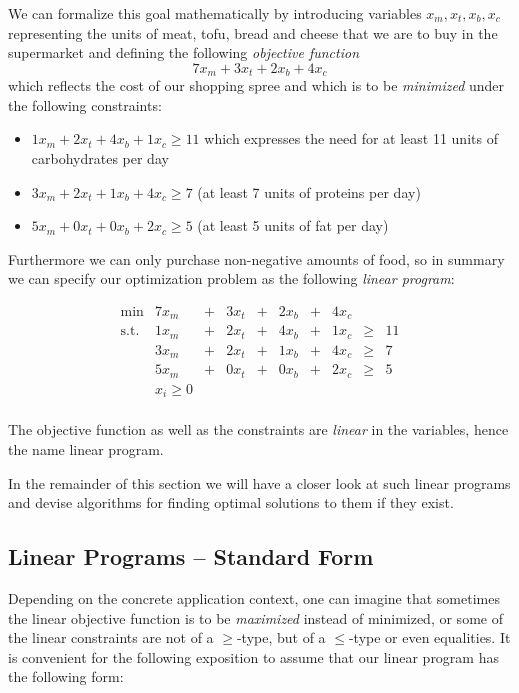 \documentclass{article}
\begin{document}
We can formalize this goal mathematically by introducing variables $x_m, x_t, x_b, x_c$ representing the
units of meat, tofu, bread and cheese that we are to buy in the supermarket and defining the following
\emph{objective function} 
\[
	7 x_m +3 x_t + 2 x_b +4 x_c
\]
which reflects the cost of our shopping spree and which is to be \emph{minimized} under
the following constraints:
\begin{itemize}
\item $1 x_m + 2 x_t + 4 x_b +1 x_c \geq 11$ which expresses the need for at least 11 units of carbohydrates per day 
\item $3 x_m + 2 x_t + 1 x_b + 4 x_c \geq 7$ (at least 7 units of proteins per day)
\item $5 x_m + 0 x_t + 0 x_b + 2 x_c \geq 5$ (at least 5 units of fat per day)
\end{itemize}
Furthermore we can only purchase non-negative amounts of food, so in summary we can 
specify our optimization problem as the following \emph{linear program}:

\[
\begin{matrix}
	\min	& 7 x_m	&+& 3 x_t&+& 2 x_b&+&4 x_c&&\\  
	\mbox{s.t.}	& 1 x_m &+& 2 x_t&+& 4 x_b&+&1 x_c&\geq&11\\
			& 3 x_m &+& 2 x_t&+& 1 x_b&+&4 x_c&\geq& 7\\
	           	& 5 x_m &+& 0 x_t&+& 0 x_b&+&2 x_c&\geq& 5\\
			& x_i\geq 0\\
\end{matrix}
\]

The objective function as well as the constraints are \emph{linear} in the variables,
hence the name linear program.

In the remainder of this section we will have a closer look at such linear programs
and devise algorithms for finding optimal solutions to them if they exist.


\subsection{Linear Programs -- Standard Form}
\label{sec:standard form}
Depending on the concrete application context, one can imagine that sometimes the linear
objective function is to be \emph{maximized} instead of minimized, or some of the 
linear constraints are not of a $\geq$-type, but of a $\leq$-type or even equalities.
It is convenient for the following exposition to assume that our linear program has the
following form:
\end{document}
